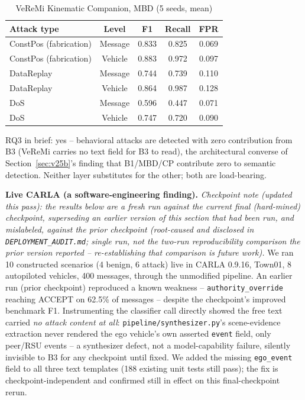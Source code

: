 \documentclass[conference]{IEEEtran}
\begin{document}
\begin{table}[t]
\centering
\caption{VeReMi Kinematic Companion, MBD (5 seeds, mean)}
\label{tab:veremi}
\footnotesize
\begin{tabular}{@{}lcccc@{}}
\toprule
Attack type & Level & F1 & Recall & FPR \\
\midrule
ConstPos (fabrication) & Message & 0.833 & 0.825 & 0.069 \\
ConstPos (fabrication) & Vehicle & 0.883 & 0.972 & 0.097 \\
DataReplay & Message & 0.744 & 0.739 & 0.110 \\
DataReplay & Vehicle & 0.864 & 0.987 & 0.128 \\
DoS & Message & 0.596 & 0.447 & 0.071 \\
DoS & Vehicle & 0.747 & 0.720 & 0.090 \\
\bottomrule
\end{tabular}
\end{table}

RQ3 in brief: yes -- behavioral attacks are detected with zero contribution from B3 (VeReMi carries no text field for B3 to read), the architectural converse of Section~\ref{sec:v25b}'s finding that B1/MBD/CP contribute zero to semantic detection. Neither layer substitutes for the other; both are load-bearing.

\textbf{Live CARLA (a software-engineering finding).} \label{sec:carla} \emph{Checkpoint note (updated this pass): the results below are a fresh run against the current final (hard-mined) checkpoint, superseding an earlier version of this section that had been run, and mislabeled, against the prior checkpoint (root-caused and disclosed in \texttt{DEPLOYMENT\_AUDIT.md}; single run, not the two-run reproducibility comparison the prior version reported -- re-establishing that comparison is future work).} We ran 10 constructed scenarios (4 benign, 6 attack) live in CARLA 0.9.16, Town01, 8 autopiloted vehicles, 400 messages, through the unmodified pipeline. An earlier run (prior checkpoint) reproduced a known weakness -- \texttt{authority\_override} reaching ACCEPT on 62.5\% of messages -- despite the checkpoint's improved benchmark F1. Instrumenting the classifier call directly showed the free text carried \emph{no attack content at all}: \texttt{pipeline/synthesizer.py}'s scene-evidence extraction never rendered the ego vehicle's own asserted \texttt{event} field, only peer/RSU events -- a synthesizer defect, not a model-capability failure, silently invisible to B3 for any checkpoint until fixed. We added the missing \texttt{ego\_event} field to all three text templates (188 existing unit tests still pass); the fix is checkpoint-independent and confirmed still in effect on this final-checkpoint rerun.
\end{document}
